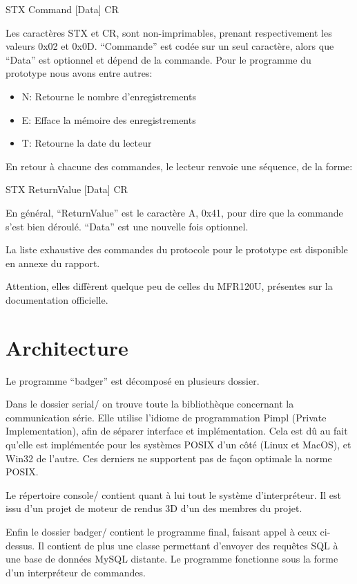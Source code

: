 STX Command [Data] CR

Les caractères STX et CR, sont non-imprimables, prenant respectivement les
valeurs 0x02 et 0x0D. ``Commande'' est codée sur un seul caractère, alors que ``Data''
est optionnel et dépend de la commande. Pour le programme du prototype nous avons
entre autres:

    \begin{itemize}
    \item N: Retourne le nombre d'enregistrements
    \item E: Efface la mémoire des enregistrements
    \item T: Retourne la date du lecteur
    \end{itemize}

En retour à chacune des commandes, le lecteur renvoie une séquence, de la forme:

STX ReturnValue [Data] CR

En général, ``ReturnValue'' est le caractère A, 0x41, pour dire que
la commande s'est bien déroulé. ``Data'' est une nouvelle fois optionnel.

La liste exhaustive des commandes du protocole pour le prototype est disponible
en annexe du rapport. 

Attention, elles diffèrent quelque peu de celles du MFR120U, présentes sur 
la documentation officielle.

    \section{Architecture}

Le programme ``badger'' est décomposé en plusieurs dossier. 

Dans le dossier serial/ on trouve toute la bibliothèque concernant la communication
série. Elle utilise l'idiome de programmation Pimpl (Private Implementation), afin 
de séparer interface et implémentation. Cela est dû au fait qu'elle est implémentée
pour les systèmes POSIX d'un côté (Linux et MacOS), et Win32 de l'autre. Ces derniers
ne supportent pas de façon optimale la norme POSIX.

Le répertoire console/ contient quant à lui tout le système d'interpréteur.
Il est issu d'un projet de moteur de rendus 3D d'un des membres du projet.

Enfin le dossier badger/ contient le programme final, faisant appel à ceux
ci-dessus. Il contient de plus une classe permettant d'envoyer des requêtes SQL
à une base de données MySQL distante. Le programme fonctionne sous la forme d'un 
interpréteur de commandes.

